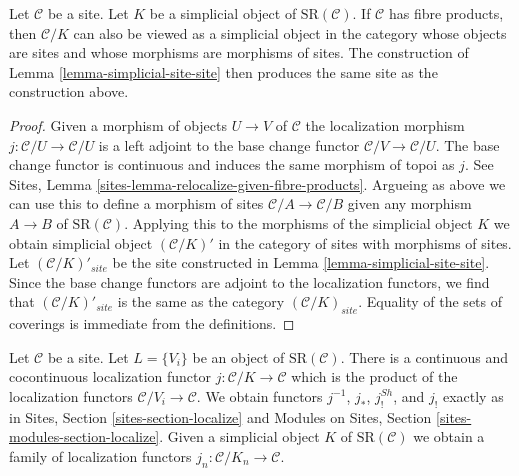 \begin{lemma}
\label{lemma-sr-when-fibre-products}
Let $\mathcal{C}$ be a site. Let $K$ be a simplicial object of
$\text{SR}(\mathcal{C})$. If $\mathcal{C}$ has fibre products,
then $\mathcal{C}/K$ can also be viewed as a simplicial object
in the category whose objects are sites and whose morphisms are
morphisms of sites. The construction of
Lemma \ref{lemma-simplicial-site-site}
then produces the same site as the construction above.
\end{lemma}

\begin{proof}
Given a morphism of objects $U \to V$ of $\mathcal{C}$ the localization
morphism $j : \mathcal{C}/U \to \mathcal{C}/U$ is a left adjoint to
the base change functor $\mathcal{C}/V \to \mathcal{C}/U$.
The base change functor is continuous and induces the same morphism of
topoi as $j$. See
Sites, Lemma \ref{sites-lemma-relocalize-given-fibre-products}.
Argueing as above we can use this to define a morphism of sites
$\mathcal{C}/A \to \mathcal{C}/B$ given any morphism $A \to B$
of $\text{SR}(\mathcal{C})$. Applying this to the morphisms of
the simplicial object $K$ we obtain simplicial object
$(\mathcal{C}/K)'$ in the category of sites with morphisms of sites.
Let $(\mathcal{C}/K)'_{site}$ be the site constructed in
Lemma \ref{lemma-simplicial-site-site}.
Since the base change functors are adjoint to the localization
functors, we find that $(\mathcal{C}/K)'_{site}$ is the same
as the category $(\mathcal{C}/K)_{site}$. Equality of the
sets of coverings is immediate from the definitions.
\end{proof}

\noindent
Let $\mathcal{C}$ be a site. Let $L = \{V_i\}$ be an object of
$\text{SR}(\mathcal{C})$. There is a continuous and cocontinuous
localization functor $j : \mathcal{C}/K \to \mathcal{C}$ which is
the product of the localization functors $\mathcal{C}/V_i \to \mathcal{C}$.
We obtain functors $j^{-1}$, $j_*$, $j^{Sh}_!$, and $j_!$ exactly
as in Sites, Section \ref{sites-section-localize} and
Modules on Sites, Section \ref{sites-modules-section-localize}.
Given a simplicial
object $K$ of $\text{SR}(\mathcal{C})$ we obtain a family
of localization functors $j_n : \mathcal{C}/K_n \to \mathcal{C}$.

